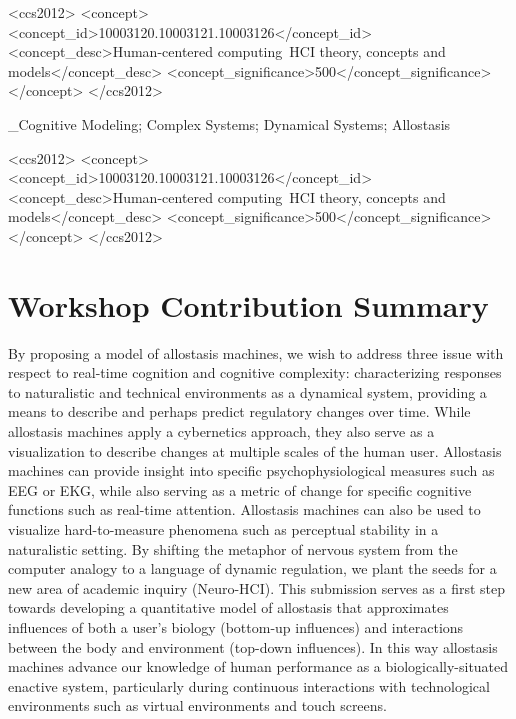 \documentclass{sigchi}
\begin{document}

\begin{CCSXML}
<ccs2012>
   <concept>
       <concept_id>10003120.10003121.10003126</concept_id>
       <concept_desc>Human-centered computing~HCI theory, concepts and models</concept_desc>
       <concept_significance>500</concept_significance>
       </concept>
 </ccs2012>
\end{CCSXML}

\keywords  _Cognitive Modeling; Complex Systems; Dynamical Systems; Allostasis

\printccsdesc
\begin{CCSXML}
<ccs2012>
   <concept>
       <concept_id>10003120.10003121.10003126</concept_id>
       <concept_desc>Human-centered computing~HCI theory, concepts and models</concept_desc>
       <concept_significance>500</concept_significance>
       </concept>
 </ccs2012>
\end{CCSXML}

\section{Workshop Contribution Summary}

By proposing a model of allostasis machines, we wish to address three issue with respect to real-time cognition and cognitive complexity: characterizing responses to naturalistic and technical environments as a dynamical system, providing a means to describe and perhaps predict regulatory changes over time. While allostasis machines apply a cybernetics approach, they also serve as a visualization to describe changes at multiple scales of the human user. Allostasis machines can provide insight into specific psychophysiological measures such as EEG or EKG, while also serving as a metric of change for specific cognitive functions such as real-time attention. Allostasis machines can also be used to visualize hard-to-measure phenomena such as perceptual stability in a naturalistic setting. By shifting 
the metaphor of nervous system from the computer analogy to a language of dynamic regulation, we plant the seeds for a new area of academic inquiry (Neuro-HCI). This submission serves as a first step towards developing a quantitative model of allostasis that approximates influences of both a user's biology (bottom-up influences) and interactions between the body and environment (top-down influences). In this way allostasis machines advance our knowledge of human performance as a biologically-situated enactive system, particularly during continuous interactions with technological environments such as virtual environments and touch screens.
\end{document}
